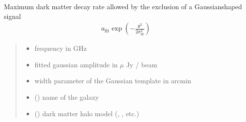 \documentclass[letterpaper,10pt,english]{sphinxmanual}
\begin{document}
\begin{fulllineitems}
\label{\detokenize{diffsph:diffsph.limits.decay_rate_gausslim}}
\pysigstartsignatures
{}
\pysigstopsignatures
\sphinxAtStartPar
Maximum dark matter decay rate allowed by the exclusion of a Gaussian\sphinxhyphen{}shaped signal
\begin{equation*}
\begin{split}a_\text{fit}\exp\left(-\frac{\theta^2}{2\sigma_\text{fit}^2}\right)\end{split}
\end{equation*}\begin{quote}\begin{description}
\begin{itemize}
\item {} 
\sphinxAtStartPar
{} \textendash{} frequency in GHz

\item {} 
\sphinxAtStartPar
{} \textendash{} fitted gaussian amplitude in \(\mu\) Jy / beam

\item {} 
\sphinxAtStartPar
{} \textendash{} width parameter of the Gaussian template in arcmin

\item {} 
\sphinxAtStartPar
{} () \textendash{} name of the galaxy

\item {} 
\sphinxAtStartPar
{} () \textendash{} dark matter halo model (, , etc.)


\end{itemize}
\end{description}
\end{quote}
\end{fulllineitems}
\end{document}

